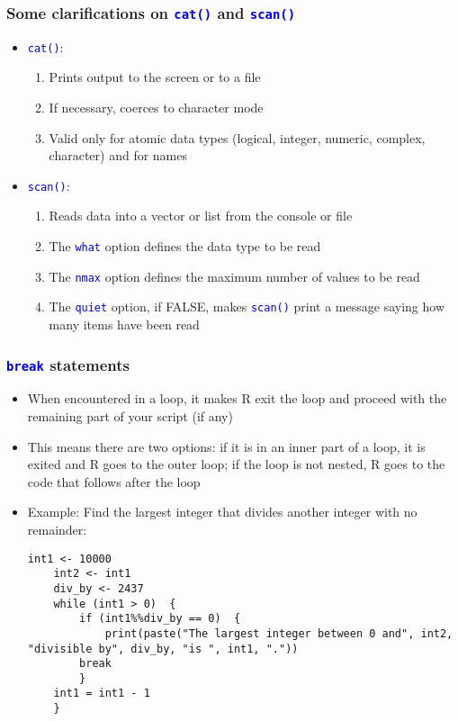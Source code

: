 \documentclass[10pt]{beamer}
\newcommand{\cc}[1]{\texttt{\textcolor{blue}{#1}}}
\theoremstyle{definition}
\begin{document}
\begin{frame}[fragile]
\frametitle{Some clarifications on \cc{cat()} and \cc{scan()}}
\begin{itemize}
	\item \cc{cat()}: 
	\begin{enumerate}
		\item Prints output to the screen or to a file
		\item If necessary, coerces to character mode
		\item Valid only for atomic data types (logical, integer, numeric,  complex, character) and for names
	\end{enumerate}
	\item \cc{scan()}:
	\begin{enumerate}
		\item Reads data into a vector or list from the console or file
		\item The \cc{what} option defines the data type to be read
		\item The \cc{nmax} option defines the maximum number of values to be read
		\item The \cc{quiet} option, if FALSE, makes \cc{scan()} print a message saying how many items have been read
	\end{enumerate}
\end{itemize}
\end{frame}

\begin{frame}[fragile]
\frametitle{\cc{break} statements}
\begin{itemize}
	\item When encountered in a loop, it makes R exit the loop and proceed with the remaining part of your script (if any)
	\item This means there are two options: if it is in an inner part of a loop, it is exited and R goes to the outer loop; if the loop is not nested, R goes to the code that follows after the loop
	\item Example: Find the largest integer that divides another integer with no remainder:
	\begin{lstlisting}[style = rstyle, breaklines]
	int1 <- 10000
	int2 <- int1
	div_by <- 2437
	while (int1 > 0)  {
		if (int1%%div_by == 0)  {
			print(paste("The largest integer between 0 and", int2, "divisible by", div_by, "is ", int1, "."))
		break
		}
	int1 = int1 - 1
	}
	\end{lstlisting}
\end{itemize}
\end{frame}
\end{document}

